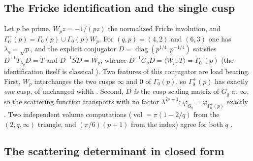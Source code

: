 \documentclass[11pt]{article}
\theoremstyle{definition}
\theoremstyle{remark}
\begin{document}
\subsection{The Fricke identification and the single cusp}

Let $p$ be prime, $W_p z = -1/(pz)$ the normalized Fricke involution,
and $\Gamma_0^+(p) = \Gamma_0(p) \cup \Gamma_0(p)W_p$. For
$(q,p) = (4,2)$ and $(6,3)$ one has $\lambda_q = \sqrt{p}$, and the
explicit conjugator $D = \operatorname{diag}(p^{1/4}, p^{-1/4})$
satisfies $D^{-1}T_{\lambda_q}D = T$ and $D^{-1}SD = W_p$, whence
$D^{-1}G_qD = \langle W_p, T\rangle = \Gamma_0^+(p)$
\cite[\S1.4]{M1F} (the identification itself is classical
\cite{Takeuchi77}). Two features of this conjugator are load bearing.
First, $W_p$ interchanges the two cusps $\infty$ and $0$ of
$\Gamma_0(p)$, so $\Gamma_0^+(p)$ has exactly \emph{one} cusp, of
unchanged width \cite[\S1.2--1.3]{M1F}. Second, $D$ \emph{is} the cusp
scaling matrix of $G_q$ at $\infty$, so the scattering function
transports with no factor $\lambda^{2s-1}$:
$\varphi_{G_q} = \varphi_{\Gamma_0^+(p)}$ exactly
\cite[eq.~(1.4)]{M1F}. Two independent volume computations
($\operatorname{vol} = \pi(1-2/q)$ from the $(2,q,\infty)$ triangle,
and $(\pi/6)(p+1)$ from the index) agree for both $q$
\cite[\S1.5]{M1F}.

\subsection{The scattering determinant in closed form}
\end{document}
